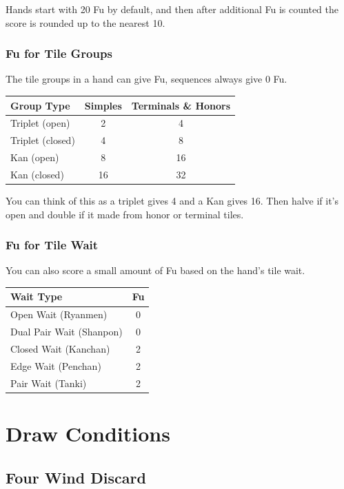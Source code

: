 \documentclass[a4paper,12pt]{article}
\begin{document}
Hands start with 20 Fu by default, and then after additional 
Fu is counted the score is rounded up to the nearest 10. 

\subsubsection{Fu for Tile Groups}

The tile groups in a hand can give Fu, sequences always 
give 0 Fu.

\begin{tabular}{|lcc|}
\hline
Group Type & Simples & Terminals \& Honors \\
\hline
Triplet (open) & 2 & 4 \\
Triplet (closed) & 4 & 8 \\
Kan (open) & 8 & 16 \\
Kan (closed) & 16 & 32 \\
\hline
\end{tabular}

You can think of this as a triplet gives 4 and a Kan gives 16. 
Then halve if it's open and double if it made from honor or 
terminal tiles.

\subsubsection{Fu for Tile Wait}

You can also score a small amount of Fu based on the 
hand's tile wait.

\begin{tabular}{|l|c|}
\hline
Wait Type & Fu \\
\hline
Open Wait (Ryanmen) & 0 \\
Dual Pair Wait (Shanpon) & 0 \\
Closed Wait (Kanchan) & 2 \\
Edge Wait (Penchan) & 2 \\
Pair Wait (Tanki) & 2 \\
\hline
\end{tabular}

\newpage
\section{Draw Conditions}

\subsection{Four Wind Discard}
\end{document}
